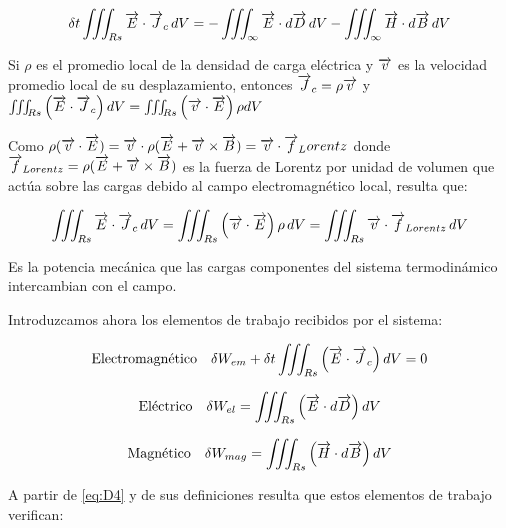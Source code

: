 \begin{equation}
	\label{eq:D4}
	\delta t \iiint_{Rs}\overrightarrow{E}\cdot\overrightarrow{J}_{c}\,dV = -\iiint_{\infty}\overrightarrow{E} \cdot d\overrightarrow{D}\,dV -\iiint_{\infty}\overrightarrow{H} \cdot d\overrightarrow{B}\,dV
\end{equation}

\begin{sloppypar}
Si $\rho$ es el promedio local de la densidad de carga eléctrica y $\overrightarrow{v}$ es la velocidad promedio local de su desplazamiento, entonces ${\overrightarrow{J}_{c}=\rho\overrightarrow{v}}$ y ${\iiint_{Rs}\left( \overrightarrow{E}\cdot\overrightarrow{J}_{c}\right) dV=\iiint_{Rs}\left( \overrightarrow{v}\cdot\overrightarrow{E}\right)\rho dV}$



Como ${\rho(\overrightarrow{v} \cdot \overrightarrow{E})= \overrightarrow{v} \cdot \rho(\overrightarrow{E} + \overrightarrow{v} \times \overrightarrow{B}) = \overrightarrow{v} \cdot \overrightarrow{f}_Lorentz}$ donde ${\overrightarrow{f}_{Lorentz} = \rho(\overrightarrow{E} + \overrightarrow{v} \times \overrightarrow{B})}$ es la fuerza de Lorentz por unidad de volumen que actúa sobre las cargas debido al campo electromagnético local, resulta que:

\begin{equation}
	\label{eq:D5}
	\iiint_{Rs}\overrightarrow{E}\cdot\overrightarrow{J}_{c}\,dV = \iiint_{Rs}\left( \overrightarrow{v} \cdot \overrightarrow{E}\right)\rho\, dV =\iiint_{Rs} \overrightarrow{v} \cdot \overrightarrow{f}_{Lorentz}\,dV
\end{equation}

Es la potencia mecánica que las cargas componentes del sistema termodinámico intercambian con el campo.

Introduzcamos ahora los elementos de trabajo recibidos por el sistema:

\begin{equation}
	\label{eq:D6}
	\text{Electromagnético}\quad \delta W_{em} + \delta t \iiint_{Rs}\left( \overrightarrow{E}\cdot\overrightarrow{J}_{c}\right) dV = 0
\end{equation}

\begin{equation}
	\label{eq:D7}
	\text{Eléctrico}\quad \delta W_{el} = \iiint_{Rs}\left( \overrightarrow{E} \cdot d\overrightarrow{D}\right)dV 
\end{equation}

\begin{equation}
	\label{eq:D8}
	\text{Magnético}\quad \delta W_{mag} = \iiint_{Rs}\left( \overrightarrow{H} \cdot d\overrightarrow{B}\right)dV 
\end{equation}

\end{sloppypar}

A partir de \ref{eq:D4} y de sus definiciones resulta que estos elementos de trabajo verifican:

